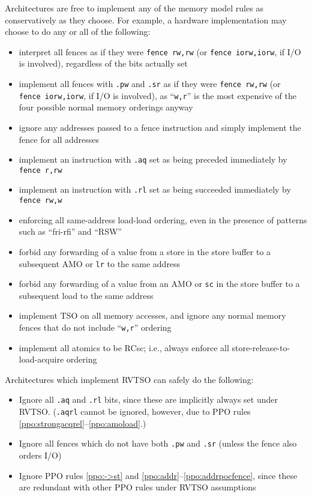 Architectures are free to implement any of the memory model rules as conservatively as they choose.  For example, a hardware implementation may choose to do any or all of the following:
  \begin{itemize}
    \item interpret all fences as if they were {\tt fence rw,rw} (or {\tt fence iorw,iorw}, if I/O is involved), regardless of the bits actually set
    \item implement all fences with {\tt .pw} and {\tt .sr} as if they were {\tt fence~rw,rw} (or {\tt fence~iorw,iorw}, if I/O is involved), as ``{\tt w,r}'' is the most expensive of the four possible normal memory orderings anyway
    \item ignore any addresses passed to a fence instruction and simply implement the fence for all addresses
    \item implement an instruction with {\tt .aq} set as being preceded immediately by {\tt fence r,rw}
    \item implement an instruction with {\tt .rl} set as being succeeded immediately by {\tt fence rw,w}
    \item enforcing all same-address load-load ordering, even in the presence of patterns such as ``fri-rfi'' and ``RSW''
    \item forbid any forwarding of a value from a store in the store buffer to a subsequent AMO or {\tt lr} to the same address
    \item forbid any forwarding of a value from an AMO or {\tt sc} in the store buffer to a subsequent load to the same address
    \item implement TSO on all memory accesses, and ignore any normal memory fences that do not include ``{\tt w,r}'' ordering
    \item implement all atomics to be RCsc; i.e., always enforce all store-release-to-load-acquire ordering
  \end{itemize}

Architectures which implement RVTSO can safely do the following:
\begin{itemize}
  \item Ignore all {\tt .aq} and {\tt .rl} bits, since these are implicitly always set under RVTSO.  ({\tt .aqrl} cannot be ignored, however, due to PPO rules \ref{ppo:strongacqrel}--\ref{ppo:amoload}.)
  \item Ignore all fences which do not have both {\tt .pw} and {\tt .sr} (unless the fence also orders I/O)
  \item Ignore PPO rules \ref{ppo:->st} and \ref{ppo:addr}--\ref{ppo:addrpocfence}, since these are redundant with other PPO rules under RVTSO assumptions
\end{itemize}

